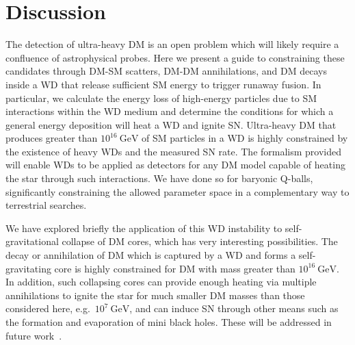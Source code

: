 \documentclass[preprintnumbers,amsmath,amssymb,prd,superscriptaddress]{revtex4}
\newcommand{\GeV}{\text{GeV}}
\begin{document}
\section{Discussion}
\label{sec:discussion}
The detection of ultra-heavy DM is an open problem which will likely require a confluence of astrophysical probes.
Here we present a guide to constraining these candidates through DM-SM scatters, DM-DM annihilations, and DM decays inside a WD that release sufficient SM energy to trigger runaway fusion.
In particular, we calculate the energy loss of high-energy particles due to SM interactions within the WD medium and determine the conditions for which a general energy deposition will heat a WD and ignite SN.
Ultra-heavy DM that produces greater than $10^{16}~\GeV$ of SM particles in a WD is highly constrained by the existence of heavy WDs and the measured SN rate.
The formalism provided will enable WDs to be applied as detectors for any DM model capable of heating the star through such interactions. 
We have done so for baryonic Q-balls, significantly constraining the allowed parameter space in a complementary way to terrestrial searches. 

We have explored briefly the application of this WD instability to self-gravitational collapse of DM cores, which has very interesting possibilities. 
The decay or annihilation of DM which is captured by a WD and forms a self-gravitating core is highly constrained for DM with mass greater than $10^{16}~\GeV$.
In addition, such collapsing cores can provide enough heating via multiple annihilations to ignite the star for much smaller DM masses than those considered here, e.g.~$10^7~\GeV$, and can induce SN through other means such as the formation and evaporation of mini black holes. 
These will be addressed in future work~\cite{us}.  
\end{document}

